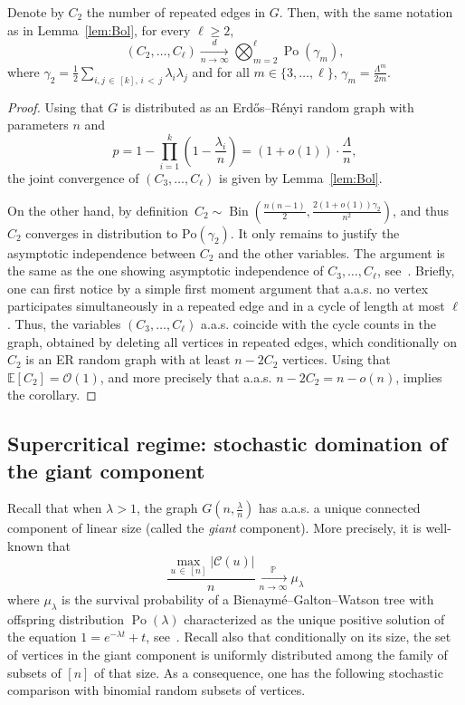 \documentclass[10pt]{amsart}
\theoremstyle{definition}\newtheorem{defi}[theo]{Definition}\newtheorem{rema}[theo]{Remark}\newtheorem{exam}[theo]{Example}\newtheorem{exem}[theo]{Example}\newtheorem{nota}[theo]{Notation}
\renewcommand{\Pr}{\mathbb{P}}
\newcommand{\bbE}{\mathbb{E}}
\newcommand{\cO}{\mathcal{O}}
\newcommand{\cC}{\mathcal{C}}
\DeclareMathOperator{\rPo}{Po}
\DeclareMathOperator{\rBin}{Bin}
\begin{document}
\begin{coro}\label{cor:Bol}
Denote by $C_2$ the number of repeated edges in $G$. Then, with the same notation as in Lemma~\ref{lem:Bol}, for every $\ell\ge 2$,
\[
(C_2, \ldots, C_{\ell})\xrightarrow[n\to \infty]{d} \bigotimes_{m=2}^\ell \rPo(\gamma_m),
\]
where $\gamma_2 = \tfrac{1}{2} \sum_{i,j\,\in\,[k],\, i\,<\,j} \lambda_i \lambda_j$ and for all $m\in \{3,\dots,\ell\}$, $\gamma_m = \tfrac{\Lambda^m}{2m}$.
\end{coro}
\begin{proof}
Using that $G$ is distributed as an Erd\H{o}s--Rényi random graph with parameters $n$ and
\[
p = 1-\prod_{i=1}^k \left(1-\frac{\lambda_i}{n}\right) =(1+o(1))\cdot \frac{\Lambda}{n},
\]
the joint convergence of $(C_3, \ldots, C_\ell)$ is given by Lemma~\ref{lem:Bol}.

On the other hand, by definition~$C_2\sim\rBin(\tfrac{n(n-1)}{2},\tfrac{2(1+o(1))\gamma_2}{n^2})$, and thus $C_2$ converges in distribution to $\text{Po}(\gamma_2)$. It only remains to justify the asymptotic independence between $C_2$ and the other variables. The argument is the same as the one showing asymptotic independence of $C_3,\dots,C_\ell$, see~\cite[Theorem~4.8 and Corollary~4.9]{Bol01}. Briefly, one can first notice by a simple first moment argument that a.a.s. no vertex participates simultaneously in a repeated edge and in a cycle of length at most $\ell$. Thus, the variables $(C_3,\dots,C_\ell)$ a.a.s. coincide with the cycle counts in the graph, obtained by deleting all vertices in repeated edges, which conditionally on $C_2$ is an ER random graph with at least $n-2C_2$ vertices. Using that $\bbE[C_2]=\cO(1)$, and more precisely that a.a.s. $n-2C_2 = n -o(n)$, implies the corollary.
\end{proof}



\subsection{Supercritical regime: stochastic domination of the giant component}\label{sec:stoc.dom}
Recall that when $\lambda>1$, the graph $G(n,\tfrac \lambda n)$ has a.a.s. a unique connected component of linear size (called the \emph{giant} component). More precisely, it is well-known that
\begin{equation}\label{LLN.giant}
\frac{\max_{u\,\in\,[n]} |\cC(u)|}{n} \xrightarrow[n\to\infty]{\Pr} \mu_\lambda
\end{equation}
where $\mu_\lambda$ is the survival probability of a Bienaymé--Galton--Watson tree with offspring distribution $\rPo(\lambda)$ characterized as the unique positive solution of the equation $1=e^{-\lambda t} + t$, see~\cite[display (3.6.2) and Theorem~4.8]{Hof16}. Recall also that conditionally on its size, the set of vertices in the giant component is uniformly distributed among the family of subsets of $[n]$ of that size. As a consequence, one has the following stochastic comparison with binomial random subsets of vertices.
\end{document}
